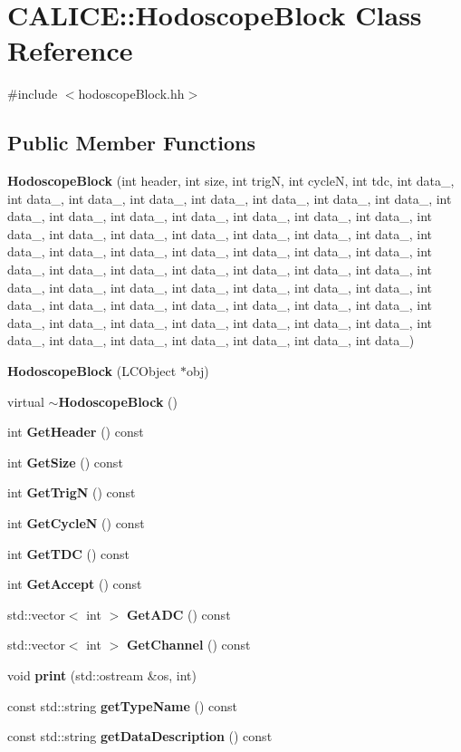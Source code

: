 \section{CALICE::HodoscopeBlock Class Reference}
\label{classCALICE_1_1HodoscopeBlock}


{\ttfamily \#include $<$hodoscopeBlock.hh$>$}\subsection*{Public Member Functions}
\begin{DoxyCompactItemize}
\item 
{\bf HodoscopeBlock} (int header, int size, int trigN, int cycleN, int tdc, int data\_, int data\_, int data\_, int data\_, int data\_, int data\_, int data\_, int data\_, int data\_, int data\_, int data\_, int data\_, int data\_, int data\_, int data\_, int data\_, int data\_, int data\_, int data\_, int data\_, int data\_, int data\_, int data\_, int data\_, int data\_, int data\_, int data\_, int data\_, int data\_, int data\_, int data\_, int data\_, int data\_, int data\_, int data\_, int data\_, int data\_, int data\_, int data\_, int data\_, int data\_, int data\_, int data\_, int data\_, int data\_, int data\_, int data\_, int data\_, int data\_, int data\_, int data\_, int data\_, int data\_, int data\_, int data\_, int data\_, int data\_, int data\_, int data\_, int data\_, int data\_, int data\_, int data\_, int data\_)
\item 
{\bf HodoscopeBlock} (LCObject $\ast$obj)
\item 
virtual {\bf $\sim$HodoscopeBlock} ()
\item 
int {\bf GetHeader} () const 
\item 
int {\bf GetSize} () const 
\item 
int {\bf GetTrigN} () const 
\item 
int {\bf GetCycleN} () const 
\item 
int {\bf GetTDC} () const 
\item 
int {\bf GetAccept} () const 
\item 
std::vector$<$ int $>$ {\bf GetADC} () const 
\item 
std::vector$<$ int $>$ {\bf GetChannel} () const 
\item 
void {\bf print} (std::ostream \&os, int)
\item 
const std::string {\bf getTypeName} () const 
\item 
const std::string {\bf getDataDescription} () const 
\end{DoxyCompactItemize}


